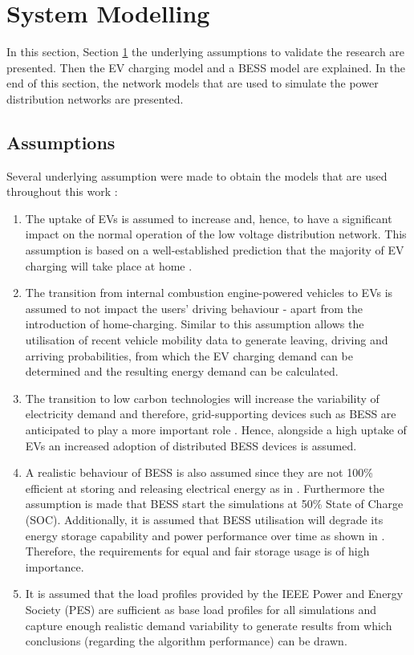 \section{System Modelling}
\label{ch4:sec:system-modelling}

In this section, Section \ref{ch4:sec:system-modelling} the underlying assumptions to validate the research are presented.
Then the EV charging model and a BESS model are explained.
In the end of this section, the network models that are used to simulate the power distribution networks are presented.

\subsection{Assumptions}
\label{ch4:subsec:assumptions}

Several underlying assumption were made to obtain the models that are used throughout this work :

\begin{enumerate}
\item
The uptake of EVs is assumed to increase and, hence, to have a significant impact on the normal operation of the low voltage distribution network.
This assumption is based on a well-established prediction that the majority of EV charging will take place at home \cite{Munkhammar2015a}.
\item
The transition from internal combustion engine-powered vehicles to EVs is assumed to not impact the users' driving behaviour - apart from the introduction of home-charging.
Similar to \cite{Dallinger2012} this assumption allows the utilisation of recent vehicle mobility data \cite{MiD2008} to generate leaving, driving and arriving probabilities, from which the EV charging demand can be determined and the resulting energy demand can be calculated.
\item
The transition to low carbon technologies will increase the variability of electricity demand and therefore, grid-supporting devices such as BESS are anticipated to play a more important role \cite{FES2015}.
Hence, alongside a high uptake of EVs an increased adoption of distributed BESS devices is assumed.
\item
A realistic behaviour of BESS is also assumed since they are not 100\% efficient at storing and releasing electrical energy as in \cite{Rowe2014a}.
Furthermore the assumption is made that BESS start the simulations at 50\% State of Charge (SOC).
Additionally, it is assumed that BESS utilisation will degrade its energy storage capability and power performance over time as shown in \cite{Laresgoiti2015}.
Therefore, the requirements for equal and fair storage usage is of high importance.
\item
It is assumed that the load profiles provided by the IEEE Power and Energy Society (PES) are sufficient as base load profiles for all simulations and capture enough realistic demand variability to generate results from which conclusions (regarding the algorithm performance) can be drawn.
\end{enumerate}

